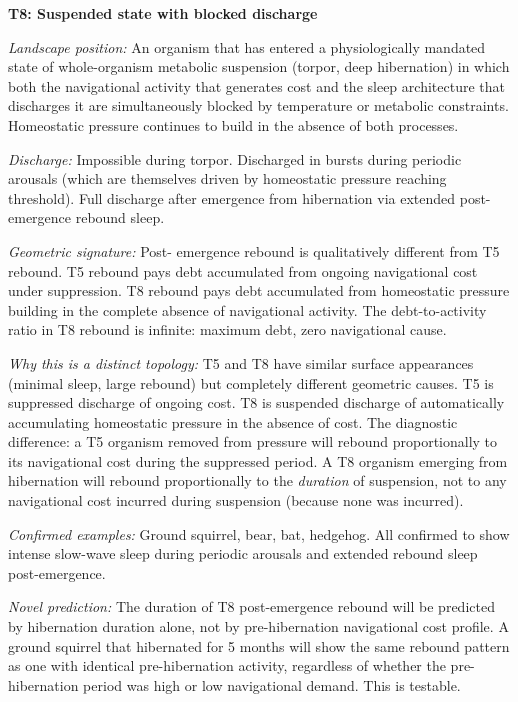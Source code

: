 \documentclass[10pt, a4paper]{article}
\begin{document}
\begin{mdframed}[backgroundcolor=newbox,
  linecolor=headergreen,linewidth=0.8pt,
  innertopmargin=0.6em,innerbottommargin=0.6em,
  innerleftmargin=0.8em,innerrightmargin=0.8em]
\textbf{T8: Suspended state with blocked
discharge}

\textit{Landscape position:} An
organism that has entered a
physiologically mandated state of
whole-organism metabolic suspension
(torpor, deep hibernation) in which
both the navigational activity that
generates cost and the sleep architecture
that discharges it are simultaneously
blocked by temperature or metabolic
constraints. Homeostatic pressure
continues to build in the absence of
both processes.

\textit{Discharge:} Impossible during
torpor. Discharged in bursts during
periodic arousals (which are themselves
driven by homeostatic pressure reaching
threshold). Full discharge after
emergence from hibernation via extended
post-emergence rebound sleep.

\textit{Geometric signature:} Post-
emergence rebound is qualitatively
different from T5 rebound. T5 rebound
pays debt accumulated from ongoing
navigational cost under suppression.
T8 rebound pays debt accumulated from
homeostatic pressure building in the
complete absence of navigational
activity. The debt-to-activity ratio
in T8 rebound is infinite: maximum
debt, zero navigational cause.

\textit{Why this is a distinct topology:}
T5 and T8 have similar surface
appearances (minimal sleep, large
rebound) but completely different
geometric causes. T5 is suppressed
discharge of ongoing cost. T8 is
suspended discharge of automatically
accumulating homeostatic pressure in
the absence of cost. The diagnostic
difference: a T5 organism removed from
pressure will rebound proportionally
to its navigational cost during the
suppressed period. A T8 organism
emerging from hibernation will rebound
proportionally to the \textit{duration}
of suspension, not to any navigational
cost incurred during suspension
(because none was incurred).

\textit{Confirmed examples:}
Ground squirrel, bear, bat, hedgehog.
All confirmed to show intense slow-wave
sleep during periodic arousals and
extended rebound sleep post-emergence.

\textit{Novel prediction:} The duration
of T8 post-emergence rebound will be
predicted by hibernation duration alone,
not by pre-hibernation navigational
cost profile. A ground squirrel that
hibernated for 5 months will show
the same rebound pattern as one with
identical pre-hibernation activity,
regardless of whether the pre-hibernation
period was high or low navigational
demand. This is testable.
\end{mdframed}
\end{document}
